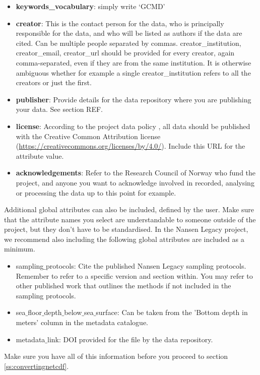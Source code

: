 \documentclass[a4paper,english, 11pt]{article}
\begin{document}
\begin{itemize}
\item \textbf{keywords\_vocabulary}: simply write `GCMD'
\item \textbf{creator}: This is the contact person for the data, who is principally responsible for the data, and who will be listed as authors if the data are cited. Can be multiple people separated by commas. creator\_institution, creator\_email, creator\_url should be provided for every creator, again comma-separated, even if they are from the same institution. It is otherwise ambiguous whether for example a single creator\_institution refers to all the creators or just the first.  
\item \textbf{publisher}: Provide details for the data repository where you are publishing your data. See section REF.
\item \textbf{license}: According to the project data policy \citep{aendatapolicy2021}, all data should be published with the Creative Common Attribution license (\url{https://creativecommons.org/licenses/by/4.0/}). Include this URL for the attribute value. 
\item \textbf{acknowledgements}: Refer to the Research Council of Norway who fund the project, and anyone you want to acknowledge involved in recorded, analysing or processing the data up to this point for example.
\end{itemize}

Additional global attributes can also be included, defined by the user. Make sure that the attribute names you select are understandable to someone outside of the project, but they don't have to be standardised. In the Nansen Legacy project, we recommend also including the following global attributes are included as a minimum. 

\begin{itemize}
\item {sampling$\_$protocols}: Cite the published Nansen Legacy sampling protocols. Remember to refer to a specific version and section within. You may refer to other published work that outlines the methods if not included in the sampling protocols.
\item {sea$\_$floor$\_$depth$\_$below$\_$sea$\_$surface}: Can be taken from the 'Bottom depth in meters' column in the metadata catalogue.
\item {metadata$\_$link}: DOI provided for the file by the data repository.
\end{itemize}   

Make sure you have all of this information before you proceed to section \ref{ss:convertingnetcdf}.
\end{document}
